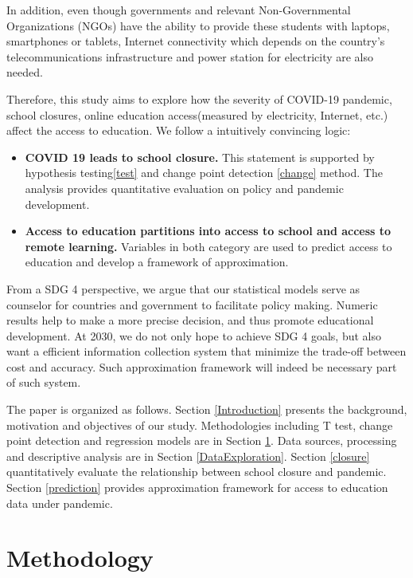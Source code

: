 \documentclass{article}
\begin{document}
In addition, even though governments and relevant Non-Governmental Organizations (NGOs) have the ability to provide these students with laptops, smartphones or tablets, Internet connectivity which depends on the country’s telecommunications infrastructure and power station for electricity\cite{OnlinenRemote} are also needed. 

Therefore, this study aims to explore how the severity of COVID-19 pandemic, school closures, online education access(measured by electricity, Internet, etc.) affect the access to education. We follow a intuitively convincing logic:

\begin{itemize}
    \item \textbf{COVID 19 leads to school closure.} This statement is supported by hypothesis testing\ref{test} and change point detection \ref{change} method. The analysis provides quantitative evaluation on policy and pandemic development.
    \item \textbf{Access to education partitions into access to school and access to remote learning.} Variables in both category are used to predict access to education and develop a framework of approximation. 
\end{itemize}

From a SDG 4 perspective, we argue that our statistical models serve as counselor for countries and government to facilitate policy making. Numeric results help to make a more precise decision, and thus promote educational development. At 2030, we do not only hope to achieve SDG 4 goals, but also want a efficient information collection system that minimize the trade-off between cost and accuracy. Such approximation framework will indeed be necessary part of such system. 


The paper is organized as follows. Section \ref{Introduction} presents the background, motivation and objectives of our study. Methodologies including T test, change point detection and regression models are in Section \ref{Methodology}. Data sources, processing and descriptive analysis are in Section \ref{DataExploration}. Section \ref{closure} quantitatively evaluate the relationship between school closure and pandemic. Section \ref{prediction} provides approximation framework for access to education data under pandemic. 

\section{Methodology}
\label{Methodology}
\end{document}
